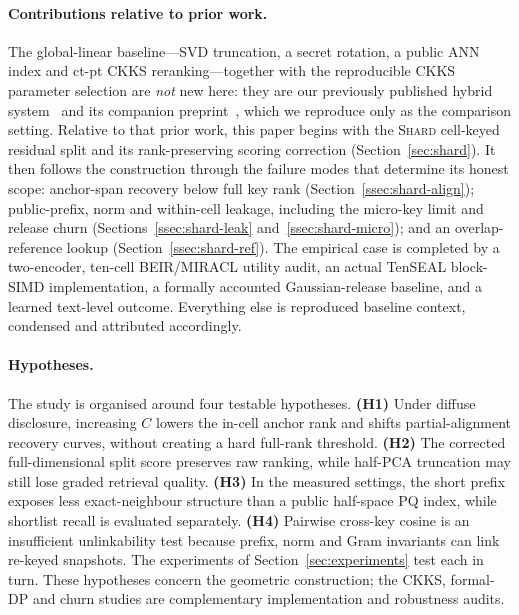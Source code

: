 \paragraph{Contributions relative to prior work.} The global-linear
baseline---SVD truncation, a secret rotation, a public ANN index and ct-pt
CKKS reranking---together with the reproducible CKKS parameter selection are
\emph{not} new here: they are our previously published hybrid
system~\cite{ref_vkit} and its companion preprint~\cite{ref_alpha}, which we
reproduce only as the comparison setting. Relative to that prior work, this
paper begins with the \textsc{Shard} cell-keyed residual split and its
rank-preserving scoring correction (Section~\ref{sec:shard}). It then follows
the construction through the failure modes that determine its honest scope:
anchor-span recovery below full key rank (Section~\ref{ssec:shard-align});
public-prefix, norm and within-cell leakage, including the micro-key limit and
release churn (Sections~\ref{ssec:shard-leak} and~\ref{ssec:shard-micro}); and
an overlap-reference lookup (Section~\ref{ssec:shard-ref}). The empirical case
is completed by a two-encoder, ten-cell BEIR/MIRACL utility audit, an actual
TenSEAL block-SIMD implementation, a formally accounted Gaussian-release
baseline, and a learned text-level outcome. Everything else is reproduced
baseline context, condensed and attributed accordingly.

\paragraph{Hypotheses.} The study is organised around four testable
hypotheses. \textbf{(H1)} Under diffuse disclosure, increasing $C$ lowers
the in-cell anchor rank and shifts partial-alignment recovery curves, without
creating a hard full-rank threshold. \textbf{(H2)} The corrected
full-dimensional split score preserves raw ranking, while half-PCA truncation
may still lose graded retrieval quality. \textbf{(H3)} In the measured
settings, the short prefix exposes less exact-neighbour structure than a
public half-space PQ index, while shortlist recall is evaluated separately.
\textbf{(H4)} Pairwise cross-key cosine is an
insufficient unlinkability test because prefix, norm and Gram invariants can
link re-keyed snapshots. The experiments of
Section~\ref{sec:experiments} test each in turn. These hypotheses concern the
geometric construction; the CKKS, formal-DP and churn studies are
complementary implementation and robustness audits.

